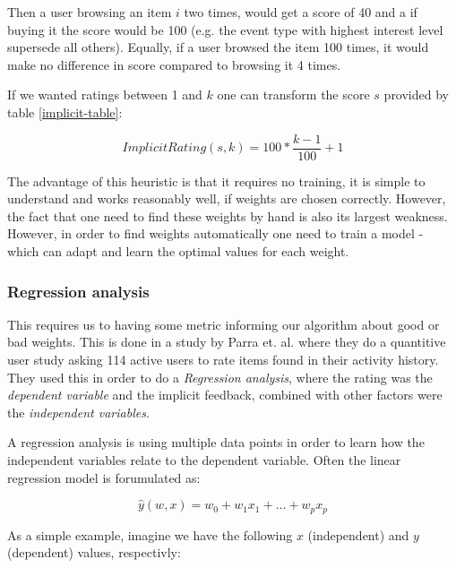 
Then a user browsing an item $i$ two times, would get a score of 40  and a if
buying it the score would be 100 (e.g. the event type with highest interest
level supersede all others). Equally, if a user browsed the item 100 times, it
would make no difference in score compared to browsing it 4 times.

If we wanted ratings between 1 and $k$ one can transform the score $s$ provided
by table \ref{implicit-table}:

\begin{equation}
  ImplicitRating(s, k) = 100 * \frac{k-1}{100} + 1 
\end{equation}

The advantage of this heuristic is that it requires no training, it is simple
to understand and works reasonably well, if weights are chosen correctly.
However, the fact that one need to find these weights by hand is also its
largest weakness. However, in order to find weights automatically one need to
train a model - which can adapt and learn the optimal values for each weight. 

\subsubsection{Regression analysis}

This requires us to having some metric informing our algorithm about good or
bad weights. This is done in a study by Parra et. al. \cite{parra2011walk}
where they do a quantitive user study asking 114 active users to rate items
found in their activity history. They used this in order to do
a \textit{Regression analysis}, where the rating was the \textit{dependent
variable} and the implicit feedback, combined with other factors were the
\textit{independent variables}.

A regression analysis is using multiple data points in order to learn how the
independent variables relate to the dependent variable. Often the linear
regression model is forumulated as:

\begin{equation}
  \label{eq-regression}
  \hat{y}(w,x) = w_0 + w_1 x_1 + \dots + w_p x_p
\end{equation}

As a simple example, imagine we have the following $x$ (independent) and $y$
(dependent) values, respectivly:

